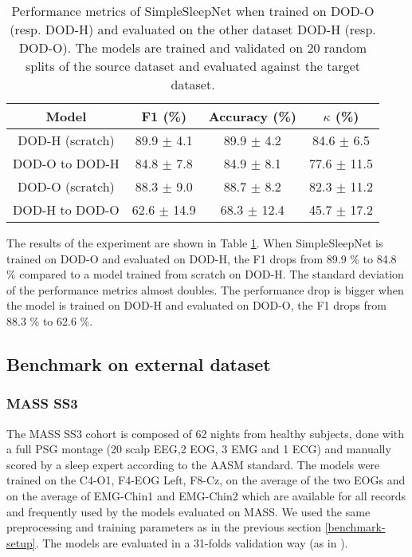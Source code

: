 \documentclass[journal]{IEEEtran}
\begin{document}
\begin{table}[ht]
\vspace{1em}
\centering
\begin{tabular}{|c c c c|} 
 \hline
 Model & F1 (\%) & Accuracy (\%)  & $\kappa$ (\%) \\ 
  \hline
     DOD-H (scratch) & 89.9 $\pm$ 4.1& 89.9 $\pm$ 4.2  & 84.6 $\pm$ 6.5 \\ 
      DOD-O to DOD-H & 84.8 $\pm$ 7.8  & 84.9 $\pm$ 8.1   & 77.6 $\pm$ 11.5  \\
\hhline{|====|}
 DOD-O (scratch)& 88.3 $\pm$ 9.0 & 88.7 $\pm$ 8.2  & 82.3 $\pm$ 11.2  \\ 
    DOD-H to DOD-O & 62.6 $\pm$ 14.9& 68.3 $\pm$ 12.4  & 45.7 $\pm$ 17.2  \\
    \hline
\end{tabular}
\caption{Performance metrics of SimpleSleepNet when trained on DOD-O (resp. DOD-H) and evaluated on the other dataset DOD-H (resp. DOD-O). The models are trained and validated on 20 random splits of the source dataset and evaluated against the target dataset.}
\label{tab:transfer_learning}
\vspace{-2em}
\end{table} 
The results of the experiment are shown in Table \ref{tab:transfer_learning}. When SimpleSleepNet is trained on DOD-O and evaluated on DOD-H, the F1 drops from 89.9 \% to 84.8 \% compared to a model trained from scratch on DOD-H. The standard deviation of the performance metrics almost doubles. The performance drop is bigger when the model is trained on DOD-H and evaluated on DOD-O, the F1 drops from 88.3 \% to 62.6 \%.


\subsection{Benchmark on external dataset}


\subsubsection{MASS SS3 \cite{OReilly2014}}
The MASS SS3 cohort is composed of 62 nights from healthy subjects, done with a full PSG montage (20 scalp EEG,2 EOG, 3 EMG and 1 ECG) and manually scored by a sleep expert according to the AASM standard. The models were trained on the C4-O1, F4-EOG Left, F8-Cz, on the average of the two EOGs and on the average of EMG-Chin1 and EMG-Chin2 which are available for all records and frequently used by the models evaluated on MASS. We used the same preprocessing and training parameters as in the previous section \ref{benchmark-setup}. The models are evaluated in a 31-folds validation way (as in \cite{Supratak2017}).
\end{document}
